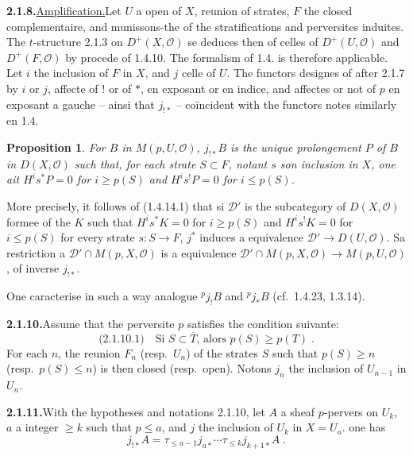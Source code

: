 \documentclass[12pt,a4paper]{article}
\theoremstyle{plain}
\newtheorem{proposition}[theorem]{Proposition}
\theoremstyle{definition}
\begin{document}
\smallskip
\noindent\textbf{2.1.8.}\quad \underline{Amplification.}\quad Let $U$ a open of $X$, reunion of strates, $F$ the closed complementaire, and munissons-the of the stratifications and perversites induites. The $t$-structure 2.1.3 on $D^+(X, \mathcal{O})$ se deduces then of celles of $D^+(U, \mathcal{O})$ and $D^+(F, \mathcal{O})$ by procede of 1.4.10. The formalism of 1.4. is therefore applicable. Let $i$ the inclusion of $F$ in $X$, and $j$ celle of $U$. The functors designes of after 2.1.7 by $i$ or $j$, affecte of $!$ or of $*$, en exposant or en indice, and affectes or not of $p$ en exposant a gauche -- ainsi that $j_{!*}$ -- co\"incident with the functors notes similarly en 1.4.

\begin{proposition}\label{prop:2.1.9}
For $B$ in $M(p, U, \mathcal{O})$, $j_{!*} B$ is the unique prolongement $P$ of $B$ in $D(X, \mathcal{O})$ such that, for each strate $S \subset F$, notant $s$ son inclusion in $X$, one ait $H^i s^* P = 0$ for $i \geqslant p(S)$ and $H^i s^! P = 0$ for $i \leqslant p(S)$.
\end{proposition}

More precisely, it follows of (1.4.14.1) that si $\mathcal{D}'$ is the subcategory of $D(X, \mathcal{O})$ formee of the $K$ such that $H^i s^* K = 0$ for $i \geqslant p(S)$ and $H^i s^! K = 0$ for $i \leqslant p(S)$ for every strate $s : S \to F$, $j^*$ induces a equivalence $\mathcal{D}' \to D(U, \mathcal{O})$. Sa restriction a $\mathcal{D}' \cap M(p, X, \mathcal{O})$ is a equivalence $\mathcal{D}' \cap M(p, X, \mathcal{O}) \to M(p, U, \mathcal{O})$, of inverse $j_{!*}$.

One caracterise in such a way analogue ${}^p j_! B$ and ${}^p j_* B$ (cf.~1.4.23, 1.3.14).

\smallskip
\noindent\textbf{2.1.10.}\quad Assume that the perversite $p$ satisfies the condition suivante:
\[
\text{(2.1.10.1)}\quad\text{Si } S \subset \overline{T}\text{, alors } p(S) \geqslant p(T)\;.
\]
For each $n$, the reunion $F_n$ (resp.\ $U_n$) of the strates $S$ such that $p(S) \geqslant n$ (resp.\ $p(S) \leqslant n$) is then closed (resp.\ open). Notons $j_n$ the inclusion of $U_{n-1}$ in $U_n$.

\smallskip
\noindent\textbf{2.1.11.}\quad With the hypotheses and notations 2.1.10, let $A$ a sheaf $p$-pervers on $U_k$, $a$ a integer $\geqslant k$ such that $p \leqslant a$, and $j$ the inclusion of $U_k$ in $X = U_a$. one has
\[
j_{!*} A = \tau_{\leqslant a-1} j_{a*} \cdots \tau_{\leqslant k} j_{k+1*} A\;.
\]
\end{document}
